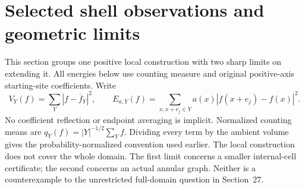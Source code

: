 \section{Selected shell observations and geometric limits}\label{sec:geometry221}
This section groups one positive local construction with two sharp limits
on extending it. All energies below use counting measure and original
positive-axis starting-site coefficients. Write
\[
 V_Y(f)=\sum_Y|f-\overline f_Y|^2,\qquad
 E_{a,Y}(f)=\sum_{x,x+e_j\in Y}a(x)|f(x+e_j)-f(x)|^2.
\]
No coefficient reflection or endpoint averaging is implicit. Normalized
counting means are $q_Y(f)=|Y|^{-1/2}\sum_Y f$. Dividing every term by
the ambient volume gives the probability-normalized convention used earlier.
The local construction does not cover the whole domain. The first limit
concerns a smaller internal-cell certificate; the second concerns an actual
annular graph. Neither is a counterexample to the unrestricted full-domain
question in Section~27.

